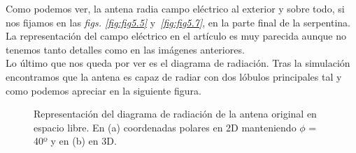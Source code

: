 \clearpage

Como podemos ver, la antena radia campo eléctrico al exterior y sobre todo, si nos fijamos en las \textit{figs. \ref{fig:fig5.5}} y~\textit{\ref{fig:fig5.7}}, en la parte final de la serpentina. La representación del campo eléctrico en el artículo es muy parecida aunque no tenemos tanto detalles como en las imágenes anteriores.\\

Lo último que nos queda por ver es el diagrama de radiación. Tras la simulación encontramos que la antena es capaz de radiar con dos lóbulos principales tal y como podemos apreciar en la siguiente figura.

\begin{figure}[!htb]
    \centering
    \caption{Representación del diagrama de radiación de la antena original en espacio libre. En (a) coordenadas polares en 2D manteniendo $\phi$ = 40º y en (b) en 3D.}
    \label{fig:fig5.8}
\end{figure}

